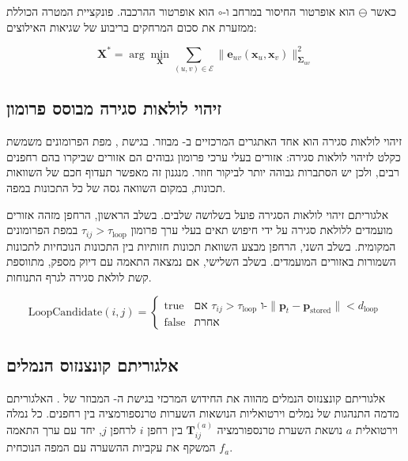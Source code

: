 כאשר $\ominus$ הוא אופרטור החיסור במרחב  ו-$\circ$ הוא אופרטור ההרכבה. פונקציית המטרה הכוללת ממזערת את סכום המרחקים בריבוע של שגיאות האילוצים:

\begin{equation}
\mathbf{X}^{*} = \arg\min_{\mathbf{X}} \sum_{(u,v) \in \mathcal{E}} \|\mathbf{e}_{uv}(\mathbf{x}_{u}, \mathbf{x}_{v})\|_{\mathbf{\Sigma}_{uv}}^{2}
\label{eq:ch04_pgo_objective}
\end{equation}

\subsection{זיהוי לולאות סגירה מבוסס פרומון}
\label{sec:ch04_loop_closure}

זיהוי לולאות סגירה הוא אחד האתגרים המרכזיים ב- מבוזר. בגישת , מפת הפרומונים משמשת כקלט לזיהוי לולאות סגירה: אזורים בעלי ערכי פרומון גבוהים הם אזורים שביקרו בהם רחפנים רבים, ולכן יש הסתברות גבוהה יותר לביקור חוזר. מנגנון זה מאפשר תעדוף חכם של השוואות תכונות, במקום השוואה גסה של כל התכונות במפה.

אלגוריתם זיהוי לולאות הסגירה פועל בשלושה שלבים. בשלב הראשון, הרחפן מזהה אזורים מועמדים ללולאת סגירה על ידי חיפוש תאים בעלי ערך פרומון $\tau_{ij} > \tau_{\text{loop}}$ במפת הפרומונים המקומית. בשלב השני, הרחפן מבצע השוואת תכונות חזותיות בין התכונות הנוכחיות לתכונות השמורות באזורים המועמדים. בשלב השלישי, אם נמצאה התאמה עם דיוק מספק, מתווספת קשת לולאת סגירה לגרף התנוחות.

\begin{equation}
\text{LoopCandidate}(i,j) = \begin{cases}
\text{true} & \text{אם } \tau_{ij} > \tau_{\text{loop}} \text{ ו-} \|\mathbf{p}_{t} - \mathbf{p}_{\text{stored}}\| < d_{\text{loop}} \\
\text{false} & \text{אחרת}
\end{cases}
\label{eq:ch04_loop_candidate}
\end{equation}

\subsection{אלגוריתם קונצנזוס הנמלים}
\label{sec:ch04_ant_consensus}

אלגוריתם קונצנזוס הנמלים מהווה את החידוש המרכזי בגישת ה- המבוזר של . האלגוריתם מדמה התנהגות של נמלים וירטואליות הנושאות השערות טרנספורמציה בין רחפנים. כל נמלה וירטואלית $a$ נושאת השערת טרנספורמציה $\mathbf{T}_{ij}^{(a)}$ בין רחפן $i$ לרחפן $j$, יחד עם ערך התאמה $f_{a}$ המשקף את עקביות ההשערה עם המפה הנוכחית.

